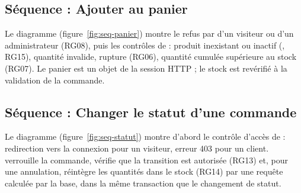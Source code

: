 \begin{landscape}
\section{Séquence : Ajouter au panier}

Le diagramme (figure~\ref{fig:seq-panier}) montre le refus par  d'un visiteur ou d'un
administrateur (RG08), puis les contrôles de  : produit inexistant ou inactif
(, RG15), quantité invalide, rupture (RG06), quantité cumulée supérieure au
stock (RG07). Le panier est un objet de la session HTTP ; le stock est revérifié à la validation de la commande.

\end{landscape}

\begin{landscape}
\section{Séquence : Changer le statut d'une commande}

Le diagramme (figure~\ref{fig:seq-statut}) montre d'abord le contrôle d'accès de  :
redirection vers la connexion pour un visiteur, erreur 403 pour un client. 
verrouille la commande, vérifie que la transition est autorisée (RG13) et, pour une annulation, réintègre les
quantités dans le stock (RG14) par une requête  calculée par la base, dans la même transaction que
le changement de statut.

\end{landscape}
